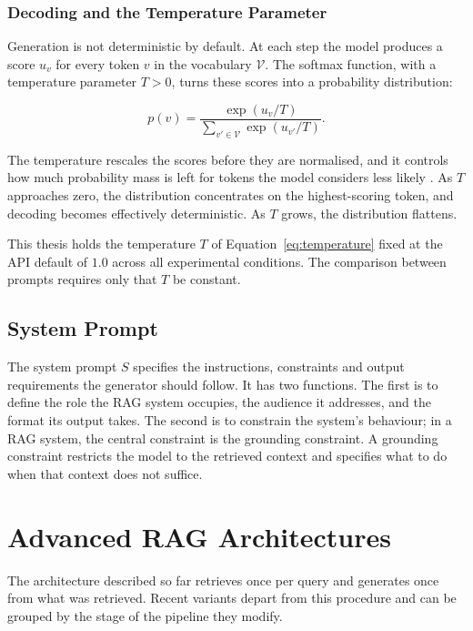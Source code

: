 \documentclass[12pt,a4paper,oneside]{scrreprt}
\begin{document}
\subsubsection{Decoding and the Temperature Parameter}

Generation is not deterministic by default. At each step the model produces a
score $u_v$ for every token $v$ in the vocabulary $\mathcal{V}$. The softmax function, with a temperature parameter $T > 0$, turns these scores into a
probability distribution:

\begin{equation}
\label{eq:temperature}
p(v) = \frac{\exp(u_v / T)}{\sum_{v' \in \mathcal{V}} \exp(u_{v'} / T)}.
\end{equation}

The temperature rescales the scores before they are normalised, and it controls
how much probability mass is left for tokens the model considers less likely
\citep{holtzman2020degeneration}. As $T$ approaches zero, the distribution
concentrates on the highest-scoring token, and decoding becomes effectively
deterministic. As $T$ grows, the distribution flattens.

This thesis holds the temperature $T$ of Equation~\eqref{eq:temperature} fixed at the API default of $1.0$ across all experimental conditions. The comparison between prompts requires only
that $T$ be constant. 
\subsection{System Prompt}

The system prompt $S$ specifies the instructions, constraints and output
requirements the generator should follow. It has two functions. The first is to define the role the RAG system occupies, the audience it addresses,
and the format its output takes. The second is to constrain the system's behaviour; in a RAG system, the central constraint is the grounding constraint. A grounding constraint restricts the model to the
retrieved context and specifies what to do when that context does not suffice.


\section{Advanced RAG Architectures}
\label{sec:advanced}

The architecture described so far retrieves once per query and generates once
from what was retrieved. Recent variants depart from this procedure and can be grouped by the stage of the pipeline they modify.
\end{document}
